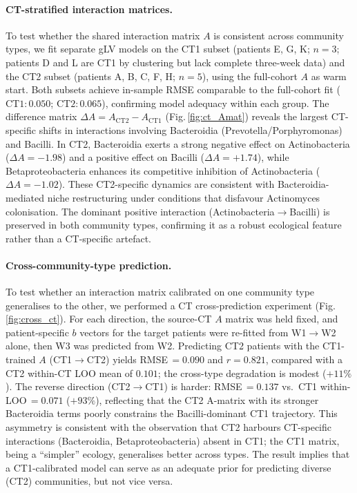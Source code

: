 \documentclass[11pt,a4paper]{article}
\begin{document}
\paragraph{CT-stratified interaction matrices.}
To test whether the shared interaction matrix $A$ is consistent across community types, we fit separate gLV models on the CT1 subset (patients E, G, K; $n=3$; patients D and L are CT1 by clustering but lack complete three-week data) and the CT2 subset (patients A, B, C, F, H; $n=5$), using the full-cohort $A$ as warm start.
Both subsets achieve in-sample RMSE comparable to the full-cohort fit ($\text{CT1}: 0.050$; $\text{CT2}: 0.065$), confirming model adequacy within each group.
The difference matrix $\Delta A = A_{\text{CT2}} - A_{\text{CT1}}$ (Fig.\,\ref{fig:ct_Amat}) reveals the largest CT-specific shifts in interactions involving Bacteroidia (Prevotella/Porphyromonas) and Bacilli.
In CT2, Bacteroidia exerts a strong negative effect on Actinobacteria ($\Delta A = -1.98$) and a positive effect on Bacilli ($\Delta A = +1.74$), while Betaproteobacteria enhances its competitive inhibition of Actinobacteria ($\Delta A = -1.02$).
These CT2-specific dynamics are consistent with Bacteroidia-mediated niche restructuring under conditions that disfavour Actinomyces colonisation.
The dominant positive interaction (Actinobacteria$\to$Bacilli) is preserved in both community types, confirming it as a robust ecological feature rather than a CT-specific artefact.

\paragraph{Cross-community-type prediction.}
To test whether an interaction matrix calibrated on one community type generalises to the other, we performed a CT cross-prediction experiment (Fig.\,\ref{fig:cross_ct}).
For each direction, the source-CT $A$ matrix was held fixed, and patient-specific $b$ vectors for the target patients were re-fitted from W1$\to$W2 alone, then W3 was predicted from W2.
Predicting CT2 patients with the CT1-trained $A$ (CT1$\to$CT2) yields RMSE\,$=0.090$ and $r=0.821$, compared with a CT2 within-CT LOO mean of $0.101$; the cross-type degradation is modest ($+11\%$).
The reverse direction (CT2$\to$CT1) is harder: RMSE\,$=0.137$ vs.\ CT1 within-LOO\,$=0.071$ ($+93\%$), reflecting that the CT2 A-matrix with its stronger Bacteroidia terms poorly constrains the Bacilli-dominant CT1 trajectory.
This asymmetry is consistent with the observation that CT2 harbours CT-specific interactions (Bacteroidia, Betaproteobacteria) absent in CT1; the CT1 matrix, being a ``simpler'' ecology, generalises better across types.
The result implies that a CT1-calibrated model can serve as an adequate prior for predicting diverse (CT2) communities, but not vice versa.
\end{document}
